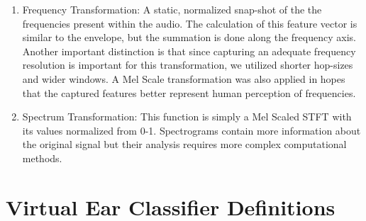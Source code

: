 \documentclass[runningheads,a4paper]{llncs}
\begin{document}
\begin{appendices}
\begin{enumerate}
\item Frequency Transformation: A static, normalized snap-shot of the the frequencies present within the audio. The calculation of this feature vector is similar to the envelope, but the summation is done along the frequency axis. Another important distinction is that since capturing an adequate frequency resolution is important for this transformation, we utilized shorter hop-sizes and wider windows. A Mel Scale transformation was also applied in hopes that the captured features better represent human perception of frequencies. 
\item Spectrum Transformation: This function is simply a Mel Scaled STFT with its values normalized from 0-1. Spectrograms contain more information about the original signal but their analysis requires more complex computational methods.
\end{enumerate}

\chapter{Virtual Ear Classifier Definitions}
\label{appendix:C}

\end{appendices}
\end{document}
